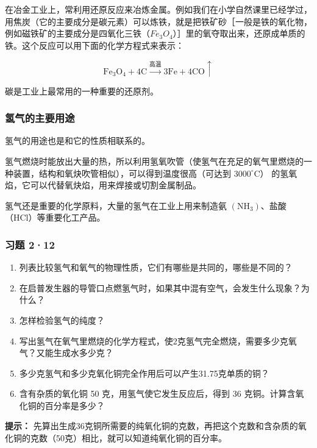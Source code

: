 在冶金工业上，常利用还原反应来冶炼金属。例如我们在小学自然课里已经学过，用焦炭（它的主要成分是碳元素）可以炼铁，就是把铁矿砂［一般是铁的氧化物，例如磁铁矿的主要成分是四氧化三铁（\(Fe_{3}O_{4}\)）］里的氧夺取出来，还原成单质的铁。这个反应可以用下面的化学方程式来表示：

\[
\mathrm{Fe}_{3} \mathrm{O}_{4} + 4 \mathrm{C} \xrightarrow {\text{高温}} 3 \mathrm{Fe} + 4 \mathrm{CO} \uparrow
\]

碳是工业上最常用的一种重要的还原剂。

\subsubsection{氢气的主要用途}

氢气的用途也是和它的性质相联系的。

氢气燃烧时能放出大量的热，所以利用氢氧吹管（使氢气在充足的氧气里燃烧的一种装置，结构和氧炔吹管相似），可以得到温度很高（可达到
\(3000^{\circ} \mathrm{C}\)）
的氢氧焰，它可以代替氧炔焰，用来焊接或切割金属制品。

氢气还是重要的化学原料，大量的氢气在工业上用来制造氨
\(\left(\mathrm{NH}_{3}\right)\)、盐酸（HCl）等重要化工产品。

\subsubsection{习题 2·12}

\begin{enumerate}
\item
  列表比较氢气和氧气的物理性质，它们有哪些是共同的，哪些是不同的？
\item
  在启普发生器的导管口点燃氢气时，如果其中混有空气，会发生什么现象？为什么？
\item
  怎样检验氢气的纯度？
\item
  写出氢气在氧气里燃烧的化学方程式，使2克氢气完全燃烧，需要多少克氧气？又能生成水多少克？
\item
  多少克氢气和多少克氧化铜完全作用后可以产生31.75克单质的铜？
\item
  含有杂质的氧化铜 50 克，用氢气使它发生反应后，得到 36
  克铜。计算含氧化铜的百分率是多少？
\end{enumerate}

\begin{shulihuadef}
\textbf{提示：}
先算出生成36克铜所需要的纯氧化铜的克数，再把这个克数和含杂质的氧化铜的克数（50克）相比，就可以知道纯氧化铜的百分率。
\end{shulihuadef}


